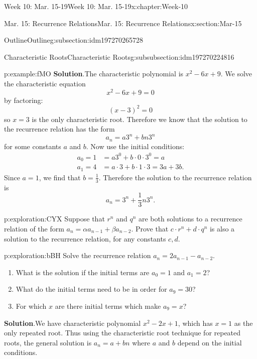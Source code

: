 \documentclass[oneside,10pt,]{book}
\newcommand{\blocktitlefont}{\relax}
\numberwithin{equation}{section}
\newcommand{\amp}{&}
\begin{document}
\begin{chapterptx}{Week 10: Mar. 15-19}{}{Week 10: Mar. 15-19}{}{}{x:chapter:Week-10}
\begin{sectionptx}{Mar. 15: Recurrence Relations}{}{Mar. 15: Recurrence Relations}{}{}{x:section:Mar-15}
\begin{subsectionptx}{Outline}{}{Outline}{}{}{g:subsection:idm197270265728}
\begin{subsubsectionptx}{Characteristic Roots}{}{Characteristic Roots}{}{}{g:subsubsection:idm197270224816}
\begin{example}{}{p:example:fMO}
\noindent\textbf{\blocktitlefont Solution}.\hypertarget{p:solution:NJk}{}\quad{}The characteristic polynomial is \(x^2 - 6x + 9\). We solve the characteristic equation%
\begin{equation*}
x^2 - 6x + 9 = 0
\end{equation*}
by factoring:%
\begin{equation*}
(x - 3)^2 = 0
\end{equation*}
so \(x =3\) is the only characteristic root. Therefore we know that the solution to the recurrence relation has the form%
\begin{equation*}
a_n = a 3^n + bn3^n
\end{equation*}
for some constants \(a\) and \(b\). Now use the initial conditions:%
\begin{align*}
a_0 = 1 \amp = a 3^0 + b\cdot 0 \cdot 3^0 = a\\
a_1 = 4 \amp = a\cdot 3 + b\cdot 1 \cdot3 = 3a + 3b\text{.}
\end{align*}
Since \(a = 1\), we find that \(b = \frac{1}{3}\). Therefore the solution to the recurrence relation is%
\begin{equation*}
a_n = 3^n + \frac{1}{3}n3^n\text{.}
\end{equation*}
%
\end{example}
\begin{exploration}{}{p:exploration:CYX}%
Suppose that \(r^n\) and \(q^n\) are both solutions to a recurrence relation of the form \(a_n = \alpha a_{n-1} + \beta a_{n-2}\). Prove that \(c\cdot r^n + d \cdot q^n\) is also a solution to the recurrence relation, for any constants \(c, d\).%
\end{exploration}%
\begin{exploration}{}{p:exploration:bBH}%
Solve the recurrence relation \(a_n = 2a_{n-1} - a_{n-2}\).%
\begin{enumerate}
\item{}What is the solution if the initial terms are \(a_0 = 1\) and \(a_1 = 2\)?%
\item{}What do the initial terms need to be in order for \(a_9 = 30\)?%
\item{}For which \(x\) are there initial terms which make \(a_9 = x\)?%
\end{enumerate}
%
\par\smallskip%
\noindent\textbf{\blocktitlefont Solution}.\hypertarget{p:solution:kVt}{}\quad{}We have characteristic polynomial \(x^2 - 2x + 1\), which has \(x = 1\) as the only repeated root. Thus using the characteristic root technique for repeated roots, the general solution is \(a_n = a + bn\) where \(a\) and \(b\) depend on the initial conditions.%

\end{exploration}
\end{subsubsectionptx}
\end{subsectionptx}
\end{sectionptx}
\end{chapterptx}
\end{document}
